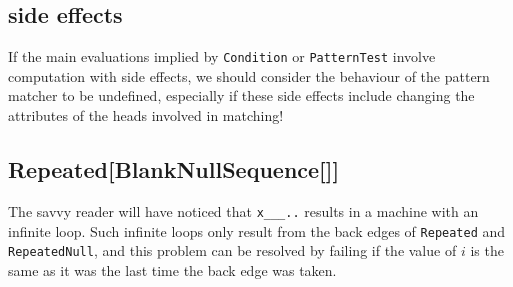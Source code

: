 \documentclass[12 pt]{amsart}
\begin{document}
\subsection{side effects}
If the main evaluations implied by {\tt Condition} or {\tt PatternTest} involve computation with side effects, we should consider the behaviour of the pattern matcher to be undefined, especially if these side effects include changing the attributes of the heads involved in matching!

\subsection{Repeated[BlankNullSequence[]]}
The savvy reader will have noticed that {\tt x\_\_\_..} results in a machine with an infinite loop. Such infinite loops only result from the back edges of {\tt Repeated} and {\tt RepeatedNull}, and this problem can be resolved by failing if the value of $i$ is the same as it was the last time the back edge was taken.
\end{document}
